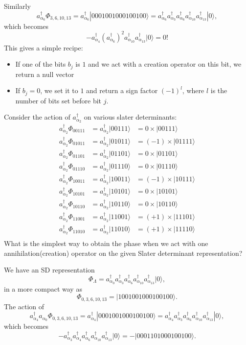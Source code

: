 Similarly
\[
a^{\dagger}_{\alpha_6}\Phi_{3,6,10,13} = a^{\dagger}_{\alpha_6}|0001001000100100\rangle=a^{\dagger}_{\alpha_6}a_{\alpha_3}^{\dagger} a_{\alpha_6}^{\dagger} a_{\alpha_{10}}^{\dagger} a_{\alpha_{13}}^{\dagger} |0\rangle,
\]
which becomes
\[
-a^{\dagger}_{\alpha_4} (a_{\alpha_6}^{\dagger})^ 2 a_{\alpha_{10}}^{\dagger} a_{\alpha_{13}}^{\dagger} |0\rangle=0!
\]
This gives a simple recipe:  
\begin{itemize}
\item If one of the bits $b_j$ is $1$ and we act with a creation operator on this bit, we return a null vector

\item If $b_j=0$, we set it to $1$ and return a sign factor $(-1)^l$, where $l$ is the number of bits set before bit $j$.
\end{itemize}

\noindent
Consider the action of $a^{\dagger}_{\alpha_2}$ on various slater determinants:
\[
\begin{array}{ccc}
a^{\dagger}_{\alpha_2}\Phi_{00111}& = a^{\dagger}_{\alpha_2}|00111\rangle&=0\times |00111\rangle\\
a^{\dagger}_{\alpha_2}\Phi_{01011}& = a^{\dagger}_{\alpha_2}|01011\rangle&=(-1)\times |01111\rangle\\
a^{\dagger}_{\alpha_2}\Phi_{01101}& = a^{\dagger}_{\alpha_2}|01101\rangle&=0\times |01101\rangle\\
a^{\dagger}_{\alpha_2}\Phi_{01110}& = a^{\dagger}_{\alpha_2}|01110\rangle&=0\times |01110\rangle\\
a^{\dagger}_{\alpha_2}\Phi_{10011}& = a^{\dagger}_{\alpha_2}|10011\rangle&=(-1)\times |10111\rangle\\
a^{\dagger}_{\alpha_2}\Phi_{10101}& = a^{\dagger}_{\alpha_2}|10101\rangle&=0\times |10101\rangle\\
a^{\dagger}_{\alpha_2}\Phi_{10110}& = a^{\dagger}_{\alpha_2}|10110\rangle&=0\times |10110\rangle\\
a^{\dagger}_{\alpha_2}\Phi_{11001}& = a^{\dagger}_{\alpha_2}|11001\rangle&=(+1)\times |11101\rangle\\
a^{\dagger}_{\alpha_2}\Phi_{11010}& = a^{\dagger}_{\alpha_2}|11010\rangle&=(+1)\times |11110\rangle\\
\end{array}
\]
What is the simplest way to obtain the phase when we act with one annihilation(creation) operator
on the given Slater determinant representation?

We have an SD representation
\[
\Phi_{\Lambda} = a_{\alpha_0}^{\dagger} a_{\alpha_3}^{\dagger} a_{\alpha_6}^{\dagger} a_{\alpha_{10}}^{\dagger} a_{\alpha_{13}}^{\dagger} |0\rangle,
\]
in a more compact way as
\[
\Phi_{0,3,6,10,13} = |1001001000100100\rangle.
\]
The action of
\[
a^{\dagger}_{\alpha_4}a_{\alpha_0}\Phi_{0,3,6,10,13} = a^{\dagger}_{\alpha_4}|0001001000100100\rangle=a^{\dagger}_{\alpha_4}a_{\alpha_3}^{\dagger} a_{\alpha_6}^{\dagger} a_{\alpha_{10}}^{\dagger} a_{\alpha_{13}}^{\dagger} |0\rangle,
\]
which becomes
\[
-a_{\alpha_3}^{\dagger} a^{\dagger}_{\alpha_4} a_{\alpha_6}^{\dagger} a_{\alpha_{10}}^{\dagger} a_{\alpha_{13}}^{\dagger} |0\rangle=-|0001101000100100\rangle.
\]

